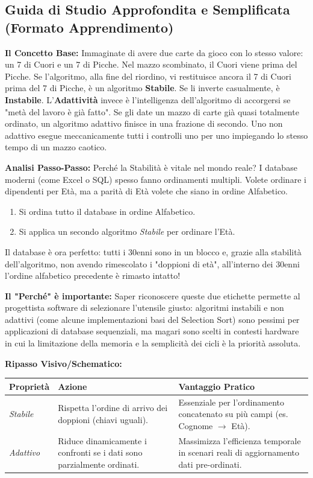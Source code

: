 \documentclass[a4paper, 11pt]{report}
\begin{document}
\vspace{0.5cm}
\subsection*{Guida di Studio Approfondita e Semplificata (Formato Apprendimento)}


\textbf{Il Concetto Base:}
Immaginate di avere due carte da gioco con lo stesso valore: un 7 di Cuori e un 7 di Picche. Nel mazzo scombinato, il Cuori viene prima del Picche.
Se l'algoritmo, alla fine del riordino, vi restituisce ancora il 7 di Cuori prima del 7 di Picche, è un algoritmo \textbf{Stabile}. Se li inverte casualmente, è \textbf{Instabile}.
L'\textbf{Adattività} invece è l'intelligenza dell'algoritmo di accorgersi se "metà del lavoro è già fatto". Se gli date un mazzo di carte già quasi totalmente ordinato, un algoritmo adattivo finisce in una frazione di secondo. Uno non adattivo esegue meccanicamente tutti i controlli uno per uno impiegando lo stesso tempo di un mazzo caotico.

\textbf{Analisi Passo-Passo:}
Perché la Stabilità è vitale nel mondo reale?
I database moderni (come Excel o SQL) spesso fanno ordinamenti multipli. Volete ordinare i dipendenti per Età, ma a parità di Età volete che siano in ordine Alfabetico.
\begin{enumerate}
    \item Si ordina tutto il database in ordine Alfabetico.
    \item Si applica un secondo algoritmo \textit{Stabile} per ordinare l'Età.
\end{enumerate}
Il database è ora perfetto: tutti i 30enni sono in un blocco e, grazie alla stabilità dell'algoritmo, non avendo rimescolato i "doppioni di età", all'interno dei 30enni l'ordine alfabetico precedente è rimasto intatto!

\textbf{Il "Perché" è importante:}
Saper riconoscere queste due etichette permette al progettista software di selezionare l'utensile giusto: algoritmi instabili e non adattivi (come alcune implementazioni basi del Selection Sort) sono pessimi per applicazioni di database sequenziali, ma magari sono scelti in contesti hardware in cui la limitazione della memoria e la semplicità dei cicli è la priorità assoluta.

\textbf{Ripasso Visivo/Schematico:}
\begin{center}
\begin{tabular}{|l|p{6cm}|p{6cm}|}
\hline
\textbf{Proprietà} & \textbf{Azione} & \textbf{Vantaggio Pratico} \\
\hline
\textit{Stabile} & Rispetta l'ordine di arrivo dei doppioni (chiavi uguali). & Essenziale per l'ordinamento concatenato su più campi (es. Cognome $\rightarrow$ Età). \\
\hline
\textit{Adattivo} & Riduce dinamicamente i confronti se i dati sono parzialmente ordinati. & Massimizza l'efficienza temporale in scenari reali di aggiornamento dati pre-ordinati. \\
\hline
\end{tabular}
\end{center}
\end{document}
